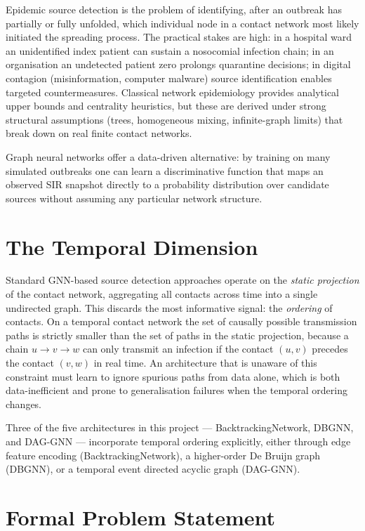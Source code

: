 \documentclass[12pt,a4paper]{report}
\begin{document}
Epidemic source detection is the problem of identifying, after an outbreak has
partially or fully unfolded, which individual node in a contact network most
likely initiated the spreading process. The practical stakes are high: in a
hospital ward an unidentified index patient can sustain a nosocomial infection
chain; in an organisation an undetected patient zero prolongs quarantine
decisions; in digital contagion (misinformation, computer malware) source
identification enables targeted countermeasures. Classical network epidemiology
provides analytical upper bounds and centrality heuristics, but these are
derived under strong structural assumptions (trees, homogeneous mixing,
infinite-graph limits) that break down on real finite contact networks.

Graph neural networks offer a data-driven alternative: by training on many
simulated outbreaks one can learn a discriminative function that maps an
observed SIR snapshot directly to a probability distribution over candidate
sources without assuming any particular network structure.

\section{The Temporal Dimension}

Standard GNN-based source detection approaches operate on the \emph{static
projection} of the contact network, aggregating all contacts across time into a
single undirected graph. This discards the most informative signal: the
\emph{ordering} of contacts. On a temporal contact network the set of causally
possible transmission paths is strictly smaller than the set of paths in the
static projection, because a chain $u \to v \to w$ can only transmit an
infection if the contact $(u,v)$ precedes the contact $(v,w)$ in real time. An
architecture that is unaware of this constraint must learn to ignore spurious
paths from data alone, which is both data-inefficient and prone to
generalisation failures when the temporal ordering changes.

Three of the five architectures in this project — BacktrackingNetwork,
DBGNN, and DAG-GNN — incorporate temporal ordering explicitly, either through
edge feature encoding (BacktrackingNetwork), a higher-order De Bruijn graph
(DBGNN), or a temporal event directed acyclic graph (DAG-GNN).

\section{Formal Problem Statement}
\end{document}
